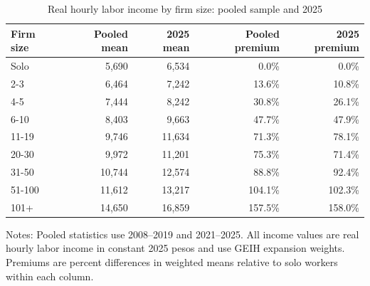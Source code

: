 \begin{table}[htbp]
  \centering
  \caption{Real hourly labor income by firm size: pooled sample and 2025}
  \label{tab:descriptive-income-size-comparison}
  \small
  \begin{tabular}{lrrrr}
    \toprule
    Firm size & Pooled mean & 2025 mean & Pooled premium & 2025 premium \\
    \midrule
    Solo & 5,690 & 6,534 & 0.0\% & 0.0\% \\
    2-3 & 6,464 & 7,242 & 13.6\% & 10.8\% \\
    4-5 & 7,444 & 8,242 & 30.8\% & 26.1\% \\
    6-10 & 8,403 & 9,663 & 47.7\% & 47.9\% \\
    11-19 & 9,746 & 11,634 & 71.3\% & 78.1\% \\
    20-30 & 9,972 & 11,201 & 75.3\% & 71.4\% \\
    31-50 & 10,744 & 12,574 & 88.8\% & 92.4\% \\
    51-100 & 11,612 & 13,217 & 104.1\% & 102.3\% \\
    101+ & 14,650 & 16,859 & 157.5\% & 158.0\% \\
    \bottomrule
  \end{tabular}
  \vspace{0.3em}
  \begin{minipage}{0.95\textwidth}
  \footnotesize
  Notes: Pooled statistics use 2008--2019 and 2021--2025. All income values are real hourly labor income in constant 2025 pesos and use GEIH expansion weights. Premiums are percent differences in weighted means relative to solo workers within each column.
  \end{minipage}
\end{table}
